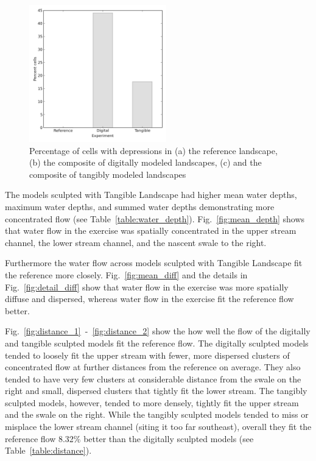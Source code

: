 \documentclass{isprs}
\begin{document}
\begin{figure}[ht!]
\begin{center}
\includegraphics[width=225px]{figures/depression_cells.png}
\caption{Percentage of cells with depressions in (a) the reference landscape, (b) the composite of digitally modeled landscapes, (c) and the composite of tangibly modeled landscapes}
\label{fig:depression_plot}
\end{center}
\end{figure}

The models sculpted with Tangible Landscape had higher 
mean water depths, 
maximum water depths, and 
summed water depths
demonstrating more concentrated flow
(see Table~\ref{table:water_depth}).
%
Fig.~\ref{fig:mean_depth}
shows that water flow in the  exercise was
spatially concentrated 
in the upper stream channel, 
the lower stream channel, 
and the nascent swale to the right.

Furthermore the water flow across models sculpted with Tangible Landscape fit the reference more closely.
Fig.~\ref{fig:mean_diff} and the details in Fig.~\ref{fig:detail_diff} 
show that water flow in the  exercise was more spatially diffuse and dispersed, 
whereas water flow in the  exercise fit the reference flow better.

Fig.~\ref{fig:distance_1}~-~\ref{fig:distance_2} show the how well the flow of the digitally and tangible sculpted models fit the reference flow. 
%
The digitally sculpted models tended to loosely fit the upper stream with fewer, more dispersed clusters of concentrated flow at further distances from the reference on average. They also tended to have very few clusters at considerable distance from the swale on the right and small, dispersed clusters that tightly fit the lower stream. 
%
The tangibly sculpted models, however, tended to more densely, tightly fit the upper stream and the swale on the right. 
While the tangibly sculpted models tended to miss or misplace the lower stream channel (siting it too far southeast), overall they fit the reference flow 8.32\% better than the digitally sculpted models (see Table~\ref{table:distance}).
\end{document}
